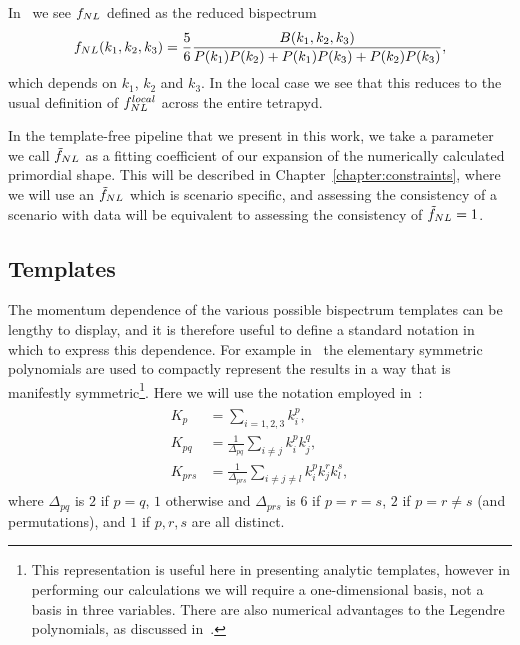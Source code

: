     In~\cite{px_burrage, transport_main} we see $f_{NL}$ defined as the reduced bispectrum
    \begin{align}\label{transport_fnl_defn}
        f_{NL}(k_1,k_2,k_3) = \frac{5}{6}\frac{B(k_1,k_2,k_3)}{P(k_1)P(k_2)+P(k_1)P(k_3)+P(k_2)P(k_3)},
    \end{align}
    which depends on $k_1$, $k_2$ and $k_3$. In the local case we see that this reduces to
    the usual definition of $f^{local}_{NL}$ across the entire tetrapyd. %


    In the template-free pipeline that we present in this work,
    we take a parameter we call $\tilde{f}_{NL}$ as a fitting coefficient of our expansion
    of the numerically calculated primordial shape.
    This will be described in Chapter~\ref{chapter:constraints},
    where we will use an $\tilde{f}_{NL}$ which is scenario specific,
    and assessing the consistency of a scenario with data
    will be equivalent to assessing the consistency of $\tilde{f}_{NL}=1$.


    \subsection{Templates}
    The momentum dependence of the various possible bispectrum templates can be lengthy
    to display,
    and it is therefore useful to define a standard notation in which to express this dependence.
    For example in~\cite{Fergusson_2010, Pajer_boostless_2020} the elementary
    symmetric polynomials are used to compactly represent the results in a way that is manifestly
    symmetric\footnote{This representation is useful here in presenting analytic templates, however in performing
    our calculations we will require a one-dimensional basis, not a basis in three variables.
    There are also numerical advantages to the Legendre polynomials, as discussed in~\cite{Fergusson_2010}.}.
    Here we will use the notation employed in~\cite{FergShell_2}:
\begin{align}\label{shape_notation}
\begin{split}
    K_p &= \sum_{i=1,2,3} k_i^p, \\
    K_{pq} &= \frac{1}{\Delta_{pq}}\sum_{i\neq j} k_i^p k_j^q,   \\
    K_{prs} &= \frac{1}{\Delta_{prs}}\sum_{i\neq j\neq l} k_i^p k_j^r k_l^s,
\end{split}
\end{align}
where $\Delta_{pq}$ is $2$ if $p=q$, $1$ otherwise
and $\Delta_{prs}$ is $6$ if $p=r=s$, $2$ if $p=r\neq s$ (and permutations),
and $1$ if $p,r,s$ are all distinct.


